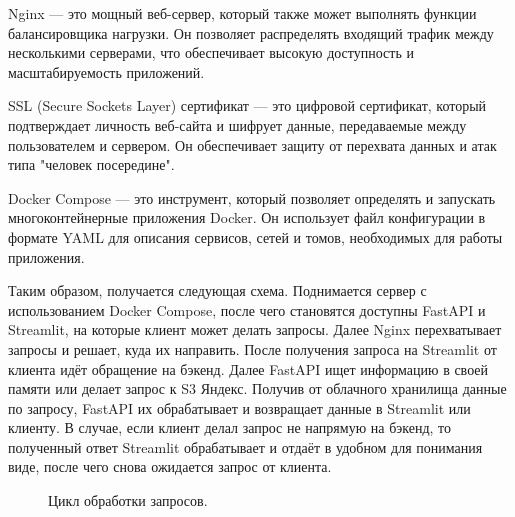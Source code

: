 \documentclass[12pt, a4paper]{article}
\begin{document}
Nginx — это мощный веб-сервер, который также может выполнять функции балансировщика нагрузки. Он позволяет распределять входящий трафик между несколькими серверами, что обеспечивает высокую доступность и масштабируемость приложений.

SSL (Secure Sockets Layer) сертификат — это цифровой сертификат, который подтверждает личность веб-сайта и шифрует данные, передаваемые между пользователем и сервером. Он обеспечивает защиту от перехвата данных и атак типа "человек посередине".

Docker Compose — это инструмент, который позволяет определять и запускать многоконтейнерные приложения Docker. Он использует файл конфигурации в формате YAML для описания сервисов, сетей и томов, необходимых для работы приложения.

Таким образом, получается следующая схема. Поднимается сервер с использованием Docker Compose, после чего становятся доступны FastAPI и Streamlit, на которые клиент может делать запросы. Далее Nginx перехватывает запросы и решает, куда их направить. После получения запроса на Streamlit от клиента идёт обращение на бэкенд. Далее FastAPI ищет информацию в своей памяти или делает запрос к S3 Яндекс. Получив от облачного хранилища данные по запросу, FastAPI их обрабатывает и возвращает данные в Streamlit или клиенту. В случае, если клиент делал запрос не напрямую на бэкенд, то полученный ответ Streamlit обрабатывает и отдаёт в удобном для понимания виде, после чего снова ожидается запрос от клиента.
\begin{figure}[!h]
\caption{Цикл обработки запросов.}
\label{fig:service}
\end{figure}
\end{document}
